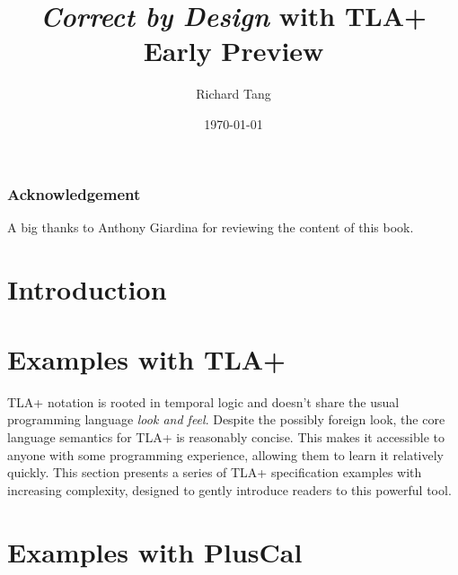 \documentclass{kdp}
\title{\textit{Correct by Design} with TLA+ \\ Early Preview}
\author{Richard Tang}
\date{\today}
\begin{document}
\maketitle


\section*{Acknowledgement}

A big thanks to Anthony Giardina for reviewing the content of this book.

\tableofcontents

\part{Introduction}





\part{Examples with TLA+}

TLA+ notation is rooted in temporal logic and doesn't share the usual
programming language \textit{look and feel}. Despite the possibly foreign look,
the core language semantics for TLA+ is reasonably concise. This makes it
accessible to anyone with some programming experience, allowing them to learn it
relatively quickly. This section presents a series of TLA+ specification
examples with increasing complexity, designed to gently introduce readers to
this powerful tool.

% 















\part{Examples with PlusCal}
\end{document}
